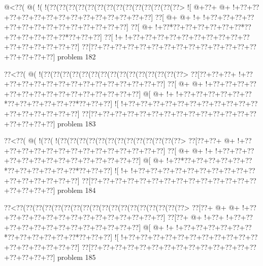 \vbox{\vbox{\goo
\- @<\0??(\- @(\- !(\- !(\0??(\0??(\0??(\0??(\0??(\0??(\0??(\0??(\0??(\0??(\0??(\0??(\0??(\0??>
\- ![\- @+\0??+\- @+\- !+\0??+\0??+\0??+\0??+\0??+\0??+\0??+\0??+\0??+\0??+\0??+\0??+\0??+\0??]
\0??[\- @+\- @+\- !+\- !+\0??+\0??+\0??+\0??+\0??+\0??+\0??+\0??+\0??+\0??+\0??+\0??+\0??+\0??]
\0??[\- @+\- !+\0??*\0??+\0??+\0??+\0??+\0??+\0??*\0??+\0??+\0??+\0??+\0??+\0??*\0??+\0??+\0??]
\0??[\- !+\- !+\0??+\0??+\0??+\0??+\0??+\0??+\0??+\0??+\0??+\0??+\0??+\0??+\0??+\0??+\0??+\0??]
\0??[\0??+\0??+\0??+\0??+\0??+\0??+\0??+\0??+\0??+\0??+\0??+\0??+\0??+\0??+\0??+\0??+\0??+\0??]
}
\hfil problem 182\hfil\break
}



\vbox{\vbox{\goo
\0??<\0??(\- @(\- !(\0??(\0??(\0??(\0??(\0??(\0??(\0??(\0??(\0??(\0??(\0??(\0??(\0??(\0??(\0??>
\0??[\0??+\0??+\0??+\- !+\0??+\0??+\0??+\0??+\0??+\0??+\0??+\0??+\0??+\0??+\0??+\0??+\0??+\0??]
\0??[\- @+\- @+\- !+\0??+\0??+\0??+\0??+\0??+\0??+\0??+\0??+\0??+\0??+\0??+\0??+\0??+\0??+\0??]
\- @[\- @+\- !+\- !+\0??+\0??+\0??+\0??+\0??+\0??*\0??+\0??+\0??+\0??+\0??+\0??*\0??+\0??+\0??]
\- ![\- !+\0??+\0??+\0??+\0??+\0??+\0??+\0??+\0??+\0??+\0??+\0??+\0??+\0??+\0??+\0??+\0??+\0??]
\0??[\0??+\0??+\0??+\0??+\0??+\0??+\0??+\0??+\0??+\0??+\0??+\0??+\0??+\0??+\0??+\0??+\0??+\0??]
}
\hfil problem 183\hfil\break
}



\vbox{\vbox{\goo
\0??<\0??(\- @(\- !(\0??(\- !(\0??(\0??(\0??(\0??(\0??(\0??(\0??(\0??(\0??(\0??(\0??(\0??(\0??>
\0??[\0??+\0??+\- @+\- !+\0??+\0??+\0??+\0??+\0??+\0??+\0??+\0??+\0??+\0??+\0??+\0??+\0??+\0??]
\0??[\- @+\- @+\- !+\- !+\0??+\0??+\0??+\0??+\0??+\0??+\0??+\0??+\0??+\0??+\0??+\0??+\0??+\0??]
\- @[\- @+\- !+\0??*\0??+\0??+\0??+\0??+\0??+\0??*\0??+\0??+\0??+\0??+\0??+\0??*\0??+\0??+\0??]
\- ![\- !+\- !+\0??+\0??+\0??+\0??+\0??+\0??+\0??+\0??+\0??+\0??+\0??+\0??+\0??+\0??+\0??+\0??]
\0??[\0??+\0??+\0??+\0??+\0??+\0??+\0??+\0??+\0??+\0??+\0??+\0??+\0??+\0??+\0??+\0??+\0??+\0??]
}
\hfil problem 184\hfil\break
}



\vbox{\vbox{\goo
\0??<\0??(\0??(\0??(\0??(\0??(\0??(\0??(\0??(\0??(\0??(\0??(\0??(\0??(\0??(\0??(\0??(\0??(\0??>
\0??[\0??+\- @+\- @+\- !+\0??+\0??+\0??+\0??+\0??+\0??+\0??+\0??+\0??+\0??+\0??+\0??+\0??+\0??]
\0??[\0??+\- @+\- !+\0??+\- !+\0??+\0??+\0??+\0??+\0??+\0??+\0??+\0??+\0??+\0??+\0??+\0??+\0??]
\- @[\- @+\- !+\- !+\0??+\0??+\0??+\0??+\0??+\0??*\0??+\0??+\0??+\0??+\0??+\0??*\0??+\0??+\0??]
\- ![\- !+\0??+\0??+\0??+\0??+\0??+\0??+\0??+\0??+\0??+\0??+\0??+\0??+\0??+\0??+\0??+\0??+\0??]
\0??[\0??+\0??+\0??+\0??+\0??+\0??+\0??+\0??+\0??+\0??+\0??+\0??+\0??+\0??+\0??+\0??+\0??+\0??]
}
\hfil problem 185\hfil\break
}



